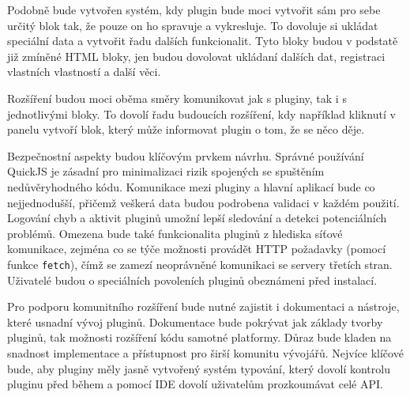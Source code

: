 Podobně bude vytvořen systém, kdy plugin bude moci vytvořit sám pro sebe určitý blok tak, že pouze on ho spravuje a vykresluje.
To dovoluje si ukládat speciální data a vytvořit řadu dalších funkcionalit.
Tyto bloky budou v podstatě již zmíněné HTML bloky, jen budou dovolovat ukládaní dalších dat, registraci vlastních vlastností a další věci.

Rozšíření budou moci oběma směry komunikovat jak s pluginy, tak i s jednotlivými bloky.
To dovolí řadu budoucích rozšíření, kdy například kliknutí v panelu vytvoří blok, který může informovat plugin o tom, že se něco děje.

Bezpečnostní aspekty budou klíčovým prvkem návrhu.
Správné používání QuickJS je zásadní pro minimalizaci rizik spojených se spuštěním nedůvěryhodného kódu.
Komunikace mezi pluginy a hlavní aplikací bude co nejjednodušší, přičemž veškerá data budou podrobena validaci v každém použití.
Logování chyb a aktivit pluginů umožní lepší sledování a detekci potenciálních problémů.
Omezena bude také funkcionalita pluginů z hlediska síťové komunikace, zejména co se týče možnosti provádět HTTP požadavky (pomocí funkce \texttt{fetch}), čímž se zamezí neoprávněné komunikaci se servery třetích stran.
Uživatelé budou o speciálních povoleních pluginů obeznámeni před instalací.

Pro podporu komunitního rozšíření bude nutné zajistit i dokumentaci a nástroje, které usnadní vývoj pluginů. 
Dokumentace bude pokrývat jak základy tvorby pluginů, tak možnosti rozšíření kódu samotné platformy. 
Důraz bude kladen na snadnost implementace a přístupnost pro širší komunitu vývojářů.
Nejvíce klíčové bude, aby pluginy měly jasně vytvořený systém typování, který dovolí kontrolu pluginu před během a pomocí IDE dovolí uživatelům prozkoumávat celé API.


    
    
